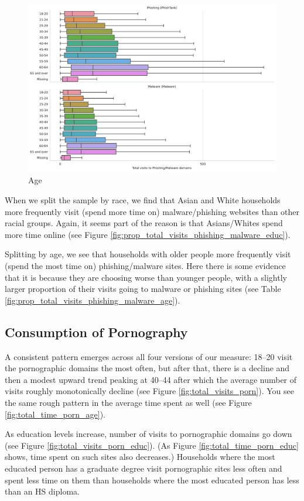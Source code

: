 \documentclass[12pt, letterpaper]{article}
\begin{document}
\begin{figure}[!htb]
\begin{minipage}[b]{0.32\textwidth}
	\includegraphics[width=\textwidth]{figs/total_visits_phishing_malware_age.pdf}\\Age
	\end{minipage}
\end{figure}

When we split the sample by race, we find that Asian and White households more frequently visit (spend more time on) malware/phishing websites than other racial groups. Again, it seems part of the reason is that Asians/Whites spend more time online (see Figure \ref{fig:prop_total_visits_phishing_malware_educ}).

Splitting by age, we see that households with older people more frequently visit (spend the most time on) phishing/malware sites. Here there is some evidence that it is because they are choosing worse than younger people, with a slightly larger proportion of their visits going to malware or phishing sites (see Table \ref{fig:prop_total_visits_phishing_malware_age}).

\subsection{Consumption of Pornography}
A consistent pattern emerges across all four versions of our measure: 18--20 visit the pornographic domains the most often, but after that, there is a decline and then a modest upward trend peaking at 40--44 after which the average number of visits roughly monotonically decline (see Figure \ref{fig:total_visits_porn}). You see the same rough pattern in the average time spent as well (see Figure \ref{fig:total_time_porn_age}).

As education levels increase, number of visits to pornographic domains go down (see Figure \ref{fig:total_visits_porn_educ}). (As Figure \ref{fig:total_time_porn_educ} shows, time spent on such sites also decreases.) Households where the most educated person has a graduate degree visit pornographic sites less often and spent less time on them than households where the most educated person has less than an HS diploma.
\end{document}
